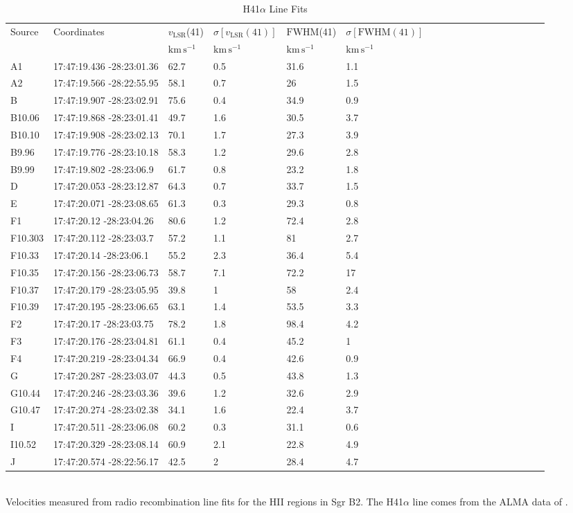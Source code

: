 \begin{table}[htp]
\caption{H41$\alpha$ Line Fits}
\begin{minipage}{130mm}
\begin{tabular}{llllllllllllllllll}
\label{tab:h41afits}
Source & Coordinates & $v_\mathrm{LSR}$(41) & $\sigma\left[v_\mathrm{LSR}(41)\right]$ & $\mathrm{FWHM}$(41) & $\sigma\left[\mathrm{FWHM}(41)\right]$ \\
 &  & $\mathrm{km\,s^{-1}}$ & $\mathrm{km\,s^{-1}}$ & $\mathrm{km\,s^{-1}}$ & $\mathrm{km\,s^{-1}}$ \\
\hline
A1 & 17:47:19.436 -28:23:01.36 & 62.7 & 0.5 & 31.6 & 1.1 \\
A2 & 17:47:19.566 -28:22:55.95 & 58.1 & 0.7 & 26 & 1.5 \\
B & 17:47:19.907 -28:23:02.91 & 75.6 & 0.4 & 34.9 & 0.9 \\
B10.06 & 17:47:19.868 -28:23:01.41 & 49.7 & 1.6 & 30.5 & 3.7 \\
B10.10 & 17:47:19.908 -28:23:02.13 & 70.1 & 1.7 & 27.3 & 3.9 \\
B9.96 & 17:47:19.776 -28:23:10.18 & 58.3 & 1.2 & 29.6 & 2.8 \\
B9.99 & 17:47:19.802 -28:23:06.9 & 61.7 & 0.8 & 23.2 & 1.8 \\
D & 17:47:20.053 -28:23:12.87 & 64.3 & 0.7 & 33.7 & 1.5 \\
E & 17:47:20.071 -28:23:08.65 & 61.3 & 0.3 & 29.3 & 0.8 \\
F1 & 17:47:20.12 -28:23:04.26 & 80.6 & 1.2 & 72.4 & 2.8 \\
F10.303 & 17:47:20.112 -28:23:03.7 & 57.2 & 1.1 & 81 & 2.7 \\
F10.33 & 17:47:20.14 -28:23:06.1 & 55.2 & 2.3 & 36.4 & 5.4 \\
F10.35 & 17:47:20.156 -28:23:06.73 & 58.7 & 7.1 & 72.2 & 17 \\
F10.37 & 17:47:20.179 -28:23:05.95 & 39.8 & 1 & 58 & 2.4 \\
F10.39 & 17:47:20.195 -28:23:06.65 & 63.1 & 1.4 & 53.5 & 3.3 \\
F2 & 17:47:20.17 -28:23:03.75 & 78.2 & 1.8 & 98.4 & 4.2 \\
F3 & 17:47:20.176 -28:23:04.81 & 61.1 & 0.4 & 45.2 & 1 \\
F4 & 17:47:20.219 -28:23:04.34 & 66.9 & 0.4 & 42.6 & 0.9 \\
G & 17:47:20.287 -28:23:03.07 & 44.3 & 0.5 & 43.8 & 1.3 \\
G10.44 & 17:47:20.246 -28:23:03.36 & 39.6 & 1.2 & 32.6 & 2.9 \\
G10.47 & 17:47:20.274 -28:23:02.38 & 34.1 & 1.6 & 22.4 & 3.7 \\
I & 17:47:20.511 -28:23:06.08 & 60.2 & 0.3 & 31.1 & 0.6 \\
I10.52 & 17:47:20.329 -28:23:08.14 & 60.9 & 2.1 & 22.8 & 4.9 \\
J & 17:47:20.574 -28:22:56.17 & 42.5 & 2 & 28.4 & 4.7 \\
\hline
\end{tabular}
\\
Velocities measured from radio recombination line fits for the HII regions in Sgr B2.  The H41$\alpha$ line comes from the ALMA data of \citet{Ginsburg2018a}.
\end{minipage}
\end{table}
